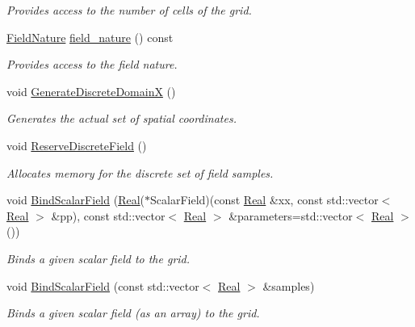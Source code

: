 \begin{DoxyCompactItemize}
\begin{DoxyCompactList}\small\item\em Provides access to the number of cells of the grid. \end{DoxyCompactList}\item 
\hyperlink{group__c02-enums_ga4c54f2a329cfb4e56213b02a259d19e2}{Field\+Nature} \hyperlink{classmtk_1_1UniStgGrid1D_a6f6a5a23011fe90971ed6b8f5f640cd2}{field\+\_\+nature} () const 
\begin{DoxyCompactList}\small\item\em Provides access to the field nature. \end{DoxyCompactList}\item 
void \hyperlink{classmtk_1_1UniStgGrid1D_a36a7a85e237a4f85c603eac8cf67a704}{Generate\+Discrete\+Domain\+X} ()
\begin{DoxyCompactList}\small\item\em Generates the actual set of spatial coordinates. \end{DoxyCompactList}\item 
void \hyperlink{classmtk_1_1UniStgGrid1D_a43ce8a21fa723ac444b92d02ef6782e7}{Reserve\+Discrete\+Field} ()
\begin{DoxyCompactList}\small\item\em Allocates memory for the discrete set of field samples. \end{DoxyCompactList}\item 
void \hyperlink{classmtk_1_1UniStgGrid1D_a6ad3040de719dff71d934f0062e9860f}{Bind\+Scalar\+Field} (\hyperlink{group__c01-roots_gac080bbbf5cbb5502c9f00405f894857d}{Real}($\ast$Scalar\+Field)(const \hyperlink{group__c01-roots_gac080bbbf5cbb5502c9f00405f894857d}{Real} \&xx, const std\+::vector$<$ \hyperlink{group__c01-roots_gac080bbbf5cbb5502c9f00405f894857d}{Real} $>$ \&pp), const std\+::vector$<$ \hyperlink{group__c01-roots_gac080bbbf5cbb5502c9f00405f894857d}{Real} $>$ \&parameters=std\+::vector$<$ \hyperlink{group__c01-roots_gac080bbbf5cbb5502c9f00405f894857d}{Real} $>$())
\begin{DoxyCompactList}\small\item\em Binds a given scalar field to the grid. \end{DoxyCompactList}\item 
void \hyperlink{classmtk_1_1UniStgGrid1D_af267608747876c776905679f548982e3}{Bind\+Scalar\+Field} (const std\+::vector$<$ \hyperlink{group__c01-roots_gac080bbbf5cbb5502c9f00405f894857d}{Real} $>$ \&samples)
\begin{DoxyCompactList}\small\item\em Binds a given scalar field (as an array) to the grid. \end{DoxyCompactList}\item 

\end{DoxyCompactItemize}
